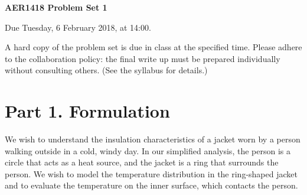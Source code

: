 \documentclass[preprint,11pt]{article}
\begin{document}
\noindent\begin{Large}\textbf{AER1418 Problem Set 1}\end{Large} \hfill Due Tuesday, 6 February 2018, at 14:00.

\vspace{1em}
\noindent A hard copy of the problem set is due in class at the specified time.  %
Please adhere to the collaboration policy: the final write up must be prepared individually without consulting others. (See the syllabus for details.)

\section*{Part 1. Formulation}
We wish to understand the insulation characteristics of a jacket worn by a person walking outside in a cold, windy day.  In our simplified analysis, the person is a circle that acts as a heat source, and the jacket is a ring that surrounds the person. We wish to model the temperature distribution in the ring-shaped jacket and to evaluate the temperature on the inner surface, which contacts the person.
\end{document}
